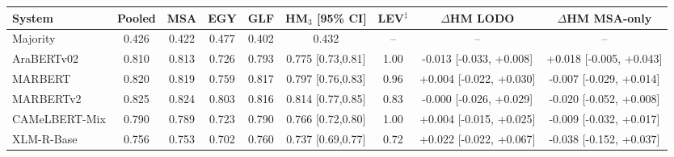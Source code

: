 \begin{tabular}{lcccccc|cc}
\toprule
\textbf{System} & Pooled & MSA & EGY & GLF & HM$_3$ [95\% CI] & LEV$^\ddagger$ & $\Delta$HM LODO & $\Delta$HM MSA-only \\
\midrule
Majority & 0.426 & 0.422 & 0.477 & 0.402 & 0.432 & -- & -- & -- \\
\midrule
AraBERTv02 & 0.810 & 0.813 & 0.726 & 0.793 & 0.775 {\scriptsize[0.73,0.81]} & 1.00 & -0.013 {\scriptsize[-0.033, +0.008]} & +0.018 {\scriptsize[-0.005, +0.043]} \\
MARBERT & 0.820 & 0.819 & 0.759 & 0.817 & 0.797 {\scriptsize[0.76,0.83]} & 0.96 & +0.004 {\scriptsize[-0.022, +0.030]} & -0.007 {\scriptsize[-0.029, +0.014]} \\
MARBERTv2 & 0.825 & 0.824 & 0.803 & 0.816 & 0.814 {\scriptsize[0.77,0.85]} & 0.83 & -0.000 {\scriptsize[-0.026, +0.029]} & -0.020 {\scriptsize[-0.052, +0.008]} \\
CAMeLBERT-Mix & 0.790 & 0.789 & 0.723 & 0.790 & 0.766 {\scriptsize[0.72,0.80]} & 1.00 & +0.004 {\scriptsize[-0.015, +0.025]} & -0.009 {\scriptsize[-0.032, +0.017]} \\
XLM-R-Base & 0.756 & 0.753 & 0.702 & 0.760 & 0.737 {\scriptsize[0.69,0.77]} & 0.72 & +0.022 {\scriptsize[-0.022, +0.067]} & -0.038 {\scriptsize[-0.152, +0.037]} \\
\bottomrule
\end{tabular}
